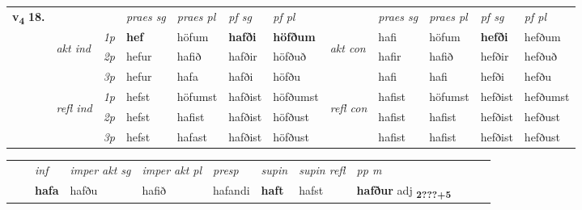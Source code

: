 \begin{tabular}{llllllllllll} \toprule
\multirow{4}{*}{{{\textbf{v{\textsubscript{4}}} \Large{\textbf{18.}}}}}  & &   &  \textit{praes sg}  & \textit{praes pl}  &\textit{ pf sg} & \textit{pf pl} &  &  \textit{praes sg}  & \textit{praes pl}  & \textit{pf sg} & \textit{pf pl } \\*
	\cmidrule{4-7} \cmidrule{9-12}
 & \multirow{3}{*}{\begin{turn}{90}\textit{akt ind}\end{turn}} & {\textit{1p}} & \textbf{hef} & höfum    & \textbf{hafði} & \textbf{höfðum} & \multirow{3}{*}{\begin{turn}{90}\textit{akt con}\end{turn}} &hafi & höfum & \textbf{hefði} & hefðum\\*
& &  {\textit{2p}} &  hefur  & hafið   & hafðir & höfðuð & & hafir & hafið & hefðir & hefðuð \\*
& &  {\textit{3p}} & hefur & hafa   & hafði & höfðu & & hafi & hafi& hefði & hefðu  \\*
\cmidrule{4-7} \cmidrule{9-12}
 &\multirow{3}{*}{\begin{turn}{90}\textit{refl ind}\end{turn}} & {\textit{1p}} & hefst & höfumst    & hafðist & höfðumst & \multirow{3}{*}{\begin{turn}{90}\textit{refl con}\end{turn}}  &hafist & höfumst & hefðist & hefðumst\\*
 &&  {\textit{2p}} &  hefst  & hafist   & hafðist & höfðust & &hafist & hafist & hefðist & hefðust \\*
& &  {\textit{3p}} & hefst & hafast   & hafðist & höfðust & & hafist & hafist& hefðist & hefðust  \\*
\cmidrule{4-7} \cmidrule{9-12}
\end{tabular}


\begin{tabular}{llllllllllll}
 & & \textit{inf} & \textit{imper akt sg} & \textit{imper akt pl}   & \textit{presp} & \textit{supin} & \textit{supin refl} & \textit{pp m}     \\*
  & & \textbf{hafa} & hafðu  & hafið   & hafandi &  \textbf{haft} & hafst & \textbf{hafður} adj \textbf{\textsubscript{2???+5}} \\*
\cmidrule{1-12}
\end{tabular}



